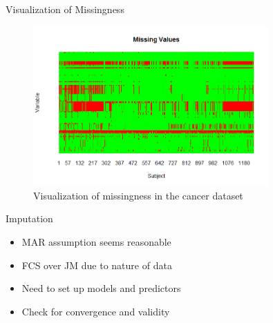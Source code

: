 \begin{frame}{Visualization of Missingness}
 \begin{figure}[h!]
  \centering
    \includegraphics[width=0.8\textwidth]{missingvalues_plot.png}
  \caption{Visualization of missingness in the cancer dataset}
\label{fig:missingplot}

\end{figure}
\end{frame}

\begin{frame}{Imputation}
 \begin{itemize}
  \item MAR assumption seems reasonable
  \item FCS over JM due to nature of data
  \item Need to set up models and predictors
  \item Check for convergence and validity
 \end{itemize}

\end{frame}




